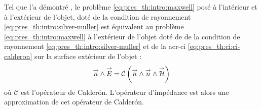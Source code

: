 Tel que l'a démontré \cite[p.~109]{cessenat_mathematical_1996}, le problème \eqref{eq:pres_th:intro:maxwell}  posé à l'intérieur et à l'extérieur de l'objet, doté de la condition de rayonnement \eqref{eq:pres_th:intro:silver-muller} est équivalent au problème \eqref{eq:pres_th:intro:maxwell} à l'extérieur de l'objet doté de de la condition de rayonnement \eqref{eq:pres_th:intro:silver-muller} et de la \gls{acr-ci} \eqref{eq:pres_th:ci:ci-calderon} sur la surface extérieur de l'objet : 
\begin{equation}
\label{eq:pres_th:ci:ci-calderon}
{\overset{\rightarrow}{n}} \wedge {\overset{\rightarrow}{E}} = \mathcal{C}\left({\overset{\rightarrow}{n}} \wedge {\overset{\rightarrow}{n}} \wedge {\overset{\rightarrow}{\mathcal{H}}}\right)
\end{equation}
où $ \mathcal{C}$ est l'opérateur de Calderón.
L'opérateur d'impédance est alors une approximation de cet opérateur de Calderón.






